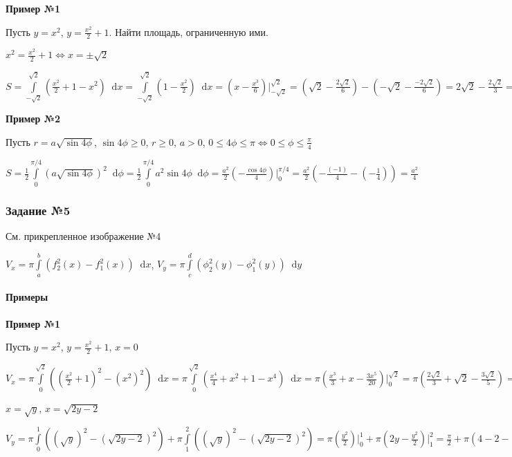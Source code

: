 \documentclass{article}
\newcommand*\diff{\mathop{}\!\mathrm{d}}
\begin{document}
\textbf{Пример №1}

Пусть $y = x^2$, $y = \frac{x^2}{2} + 1$. Найти площадь, ограниченную ими.

$x^2 = \frac{x^2}{2} + 1 \Longleftrightarrow x = \pm \sqrt{2}$

$S = \int\limits_{-\sqrt{2}}^{\sqrt{2}} (\frac{x^2}{2} + 1 - x^2) \diff x = \int\limits_{-\sqrt{2}}^{\sqrt{2}} (1 - \frac{x^2}{2}) \diff x = (x - \frac{x^3}{6}) \bigg|_{-\sqrt{2}}^{\sqrt{2}} = (\sqrt{2} - \frac{2\sqrt{2}}{6}) - (-\sqrt{2} - \frac{-2\sqrt{2}}{6}) = 2\sqrt{2} - \frac{2\sqrt{2}}{3} = \frac{4\sqrt{2}}{3}$

\hfill

\textbf{Пример №2}

Пусть $r = a \sqrt{\sin 4\phi}$, $\sin 4\phi \ge 0$, $r \ge 0$, $a > 0$, $0 \le 4\phi \le \pi \Longleftrightarrow 0 \le \phi \le \frac{\pi}{4}$

$S = \frac{1}{2} \int\limits_{0}^{\pi/4} (a \sqrt{\sin 4\phi})^2 \diff \phi = \frac{1}{2} \int\limits_{0}^{\pi/4} a^2 \sin 4 \phi \diff \phi = \frac{a^2}{2} (- \frac{\cos 4\phi}{4}) \bigg|_{0}^{\pi/4} = \frac{a^2}{2} (- \frac{(-1)}{4} - (- \frac{1}{4})) = \frac{a^2}{4}$ 

\subsubsection{Задание №5}

См. прикрепленное изображение №4

$V_{x} = \pi \int\limits_{a}^{b} (f_2^2(x) - f_1^2(x)) \diff x$, $V_y = \pi \int\limits_{c}^{d} (\phi_2^2(y) - \phi_1^2(y)) \diff y$

\paragraph{Примеры}

\textbf{Пример №1}

Пусть $y = x^2$, $y = \frac{x^2}{2} + 1$, $x = 0$

$V_x = \pi \int\limits_{0}^{\sqrt{2}} ((\frac{x^2}{2} + 1)^2 - (x^2)^2) \diff x = \pi \int\limits_{0}^{\sqrt{2}} (\frac{x^4}{4} + x^2 + 1 - x^4) \diff x = \pi (\frac{x^3}{3} + x - \frac{3x^5}{20}) \bigg|_{0}^{\sqrt{2}} = \pi (\frac{2\sqrt{2}}{3} + \sqrt{2} - \frac{3\sqrt{2}}{5}) = \pi (\frac{10\sqrt{2} + 15\sqrt{2} - 9\sqrt{2}}{15}) = \frac{16\sqrt{2}}{15} \pi$

$x = \sqrt{y}$, $x = \sqrt{2y - 2}$

$V_y = \pi \int\limits_{0}^{1} ((\sqrt{y})^2 - (\sqrt{2y - 2})^2) + \pi \int\limits_{1}^{2} ((\sqrt{y})^2 - (\sqrt{2y - 2})^2) = \pi (\frac{y^2}{2}) \bigg|_{0}^{1} + \pi (2y - \frac{y^2}{2}) \bigg|_{1}^{2} = \frac{\pi}{2} + \pi (4 - 2 - (2 - \frac{1}{2})) = \pi$
\end{document}
